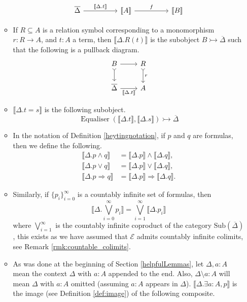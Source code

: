 \documentclass{tac}
\newcommand{\call}[1]{\mathcal{#1}}
\begin{document}
\begin{definition}
\begin{itemize}
\begin{itemize}
				\[
				\begin{tikzcd}[column sep = huge]
					\overline{\Delta} \arrow[r,"{\llbracket \Delta . t \rrbracket}"] & \llbracket A\rrbracket\arrow[r,"f"] & \llbracket B\rrbracket
				\end{tikzcd}
				\]
				\item If $R \subseteq A$ is a relation symbol corresponding to a monomorphism $r: R \to A$, and $t: A$ a term, then $\llbracket \Delta . R(t) \rrbracket$ is the subobject $B \rightarrowtail \overline{\Delta}$ such that the following is a pullback diagram.
				\[
				\begin{tikzcd}
					B\arrow[r]\arrow[d,rightarrowtail] & R\arrow[d,rightarrowtail,"r"]\\
					\overline{\Delta}\arrow[r,swap,"{\llbracket \Delta . t\rrbracket}"] & A
				\end{tikzcd}
				\]
				\item $\llbracket \Delta . t = s\rrbracket$ is the following subobject.
				\[\operatorname{Equaliser}(\llbracket \Delta . t\rrbracket, \llbracket \Delta . s \rrbracket) \rightarrowtail \overline{\Delta}\]
				\item In the notation of Definition \ref{heytingnotation}, if $p$ and $q$ are formulas, then we define the following.
				\begin{align*}
					\llbracket \Delta . p \wedge q \rrbracket &= \llbracket \Delta . p \rrbracket \wedge \llbracket \Delta . q \rrbracket,\\
					\llbracket \Delta . p \vee q \rrbracket &= \llbracket \Delta . p \rrbracket \vee \llbracket \Delta . q \rrbracket,\\
					\llbracket \Delta . p \Rightarrow q \rrbracket &= \llbracket \Delta . p \rrbracket \Rightarrow \llbracket \Delta . q \rrbracket.
				\end{align*}
				\item Similarly, if $\lbrace p_i\rbrace_{i = 0}^\infty$ is a countably infinite set of formulas, then
				\[\llbracket \Delta . \bigvee_{i = 0}^\infty p_i\rrbracket = \bigvee_{i=1}^\infty\llbracket \Delta . p_i\rrbracket\]
				where $\displaystyle\bigvee_{i=1}^{\infty}$ is the countably infinite coproduct of the category $\text{Sub}(\overline{\Delta})$, this exists as we have assumed that $\call{E}$ admits countably infinite colimits, see Remark \ref{rmk:countable_colimits}.
				\item As was done at the beginning of Section \ref{helpfulLemmas}, let $\Delta, a:A$ mean the context $\Delta$ with $a:A$ appended to the end. Also, $\Delta\setminus a:A$ will mean $\Delta$ with $a:A$ omitted (assuming $a:A$ appears in $\Delta$). $\llbracket \Delta . \exists a: A, p\rrbracket$ is the image (see Definition \ref{def:image}) of the following composite.

\end{itemize}
\end{itemize}
\end{definition}
\end{document}

